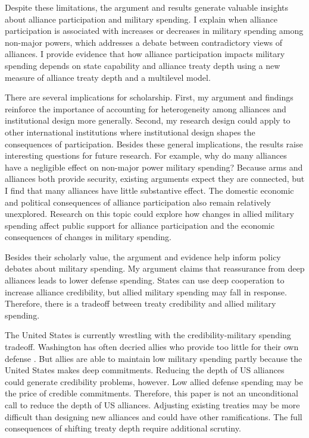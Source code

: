 \documentclass[12pt]{article}
\begin{document}
Despite these limitations, the argument and results generate valuable insights about alliance participation and military spending. 
I explain when alliance participation is associated with increases or decreases in military spending among non-major powers, which addresses a debate between contradictory views of alliances.  
I provide evidence that how alliance participation impacts military spending depends on state capability and alliance treaty depth using a new measure of alliance treaty depth and a multilevel model. 


There are several implications for scholarship. 
First, my argument and findings reinforce the importance of accounting for heterogeneity among alliances and institutional design more generally.
Second, my research design could apply to other international institutions where institutional design shapes the consequences of participation.
Besides these general implications, the results raise interesting questions for future research. 
For example, why do many alliances have a negligible effect on non-major power military spending? 
Because arms and alliances both provide security, existing arguments expect they are connected, but I find that many alliances have little substantive effect.
The domestic economic and political consequences of alliance participation also remain relatively unexplored.
Research on this topic could explore how changes in allied military spending affect public support for alliance participation and the economic consequences of changes in military spending.  


Besides their scholarly value, the argument and evidence help inform policy debates about military spending. 
My argument claims that reassurance from deep alliances leads to lower defense spending. 
States can use deep cooperation to increase alliance credibility, but allied military spending may fall in response. 
Therefore, there is a tradeoff between treaty credibility and allied military spending. 


The United States is currently wrestling with the credibility-military spending tradeoff. 
Washington has often decried allies who provide too little for their own defense \citep{Lanoszka2015}. 
But allies are able to maintain low military spending partly because the United States makes deep commitments. 
Reducing the depth of US alliances could generate credibility problems, however. 
Low allied defense spending may be the price of credible commitments.  
Therefore, this paper is not an unconditional call to reduce the depth of US alliances. 
Adjusting existing treaties may be more difficult than designing new alliances and could have other ramifications. 
The full consequences of shifting treaty depth require additional scrutiny. 

 



\singlespace
 
 
\end{document}
